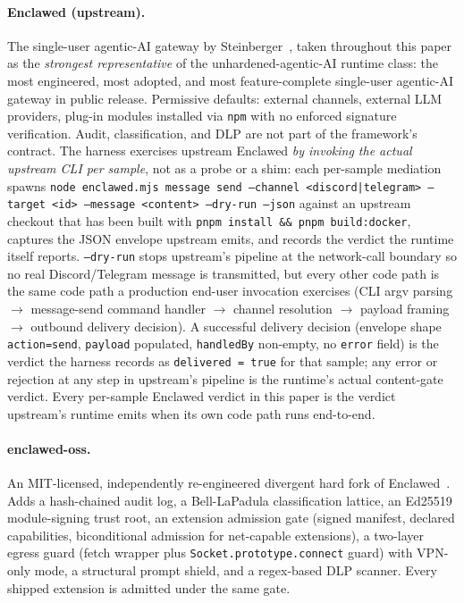 \documentclass[11pt]{article}
\begin{document}
\paragraph{Enclawed (upstream).} The single-user agentic-AI gateway
by Steinberger~\cite{Enclawed}, taken throughout this paper as the
\emph{strongest representative} of the unhardened-agentic-AI runtime
class: the most engineered, most adopted, and most feature-complete
single-user agentic-AI gateway in public release. Permissive
defaults: external channels, external LLM providers, plug-in
modules installed via \texttt{npm} with no enforced signature
verification. Audit, classification, and DLP are not part of the
framework's contract. The harness exercises upstream
Enclawed \emph{by invoking the actual upstream CLI per sample}, not as
a probe or a shim: each per-sample mediation spawns
\texttt{node enclawed.mjs message send --channel <discord|telegram>
--target <id> --message <content> --dry-run --json} against an upstream
checkout that has been built with \texttt{pnpm install \&\& pnpm
build:docker}, captures the JSON envelope upstream emits, and records
the verdict the runtime itself reports. \texttt{--dry-run} stops
upstream's pipeline at the network-call boundary so no real
Discord/Telegram message is transmitted, but every other code path is
the same code path a production end-user invocation exercises (CLI argv
parsing $\to$ message-send command handler $\to$ channel resolution
$\to$ payload framing $\to$ outbound delivery decision). A successful
delivery decision (envelope shape \texttt{action=send}, \texttt{payload}
populated, \texttt{handledBy} non-empty, no \texttt{error} field) is
the verdict the harness records as \texttt{delivered = true} for that
sample; any error or rejection at any step in upstream's pipeline is
the runtime's actual content-gate verdict. Every per-sample Enclawed
verdict in this paper is the verdict upstream's runtime emits when its
own code path runs end-to-end.

\paragraph{enclawed-oss.} An MIT-licensed, independently re-engineered
divergent hard fork of Enclawed~\cite{Metere2026enclawed}. Adds a
hash-chained audit log, a Bell-LaPadula classification lattice, an Ed25519
module-signing trust root, an extension admission gate (signed manifest,
declared capabilities, biconditional admission for net-capable
extensions), a two-layer egress guard (fetch wrapper plus
\texttt{Socket.prototype.connect} guard) with VPN-only mode, a structural
prompt shield, and a regex-based DLP scanner. Every shipped extension is
admitted under the same gate.
\end{document}
